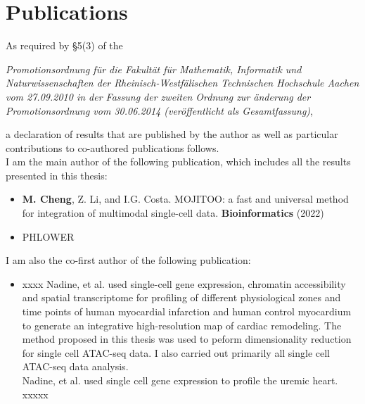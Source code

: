 \chapter*{Publications}
As required by \S 5(3) of the \\

\begin{addmargin}{0.05\textwidth}
\textit{Promotionsordnung f\"ur die Fakult\"at f\"ur Mathematik, Informatik und Naturwissenschaften der Rheinisch-Westf\"alischen Technischen Hochschule Aachen vom 27.09.2010 in der \linebreak Fassung der zweiten Ordnung zur \"anderung der Promotionsordnung vom 30.06.2014 \linebreak (ver\"offentlicht als Gesamtfassung)},
\end{addmargin} 
\vspace{0.5cm}

\noindent
a declaration of results that are published by the author as well as particular contributions to co-authored publications follows. \\


I am the main author of the following publication, which includes all the results presented in this
thesis:

\begin{addmargin}{0.02\textwidth}
	\begin{itemize}
	\item \textbf{M. Cheng}, Z. Li, and I.G. Costa. MOJITOO: a fast and universal method for integration of multimodal single-cell data. \textbf{Bioinformatics} (2022) 
		  \\
	\end{itemize}
\end{addmargin}


\begin{addmargin}{0.02\textwidth}
	\begin{itemize}
	\item PHLOWER
		  \\
	\end{itemize}
\end{addmargin}


I am also the co-first author of the following publication:\\


\begin{addmargin}{0.02\textwidth}
	\begin{itemize}
	\item xxxx
		Nadine, et al. used single-cell gene expression, chromatin accessibility and spatial transcriptome for profiling of different physiological zones and time points of human myocardial infarction and human control myocardium to generate an integrative high-resolution map of cardiac remodeling. The method proposed in this thesis was used to peform dimensionality reduction for single cell ATAC-seq data. I also carried out primarily all single cell ATAC-seq data analysis.  \\

		Nadine, et al. used single cell gene expression to profile the uremic heart.  xxxxx
	\end{itemize}
\end{addmargin}

